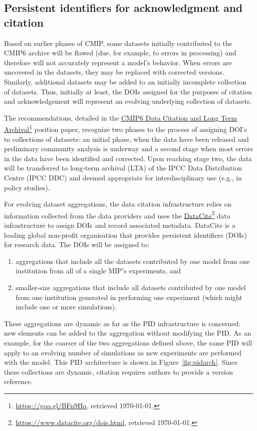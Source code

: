 \documentclass[gmd,manuscript]{copernicus}
\newcommand{\urlref}[2] {\href{#1}{#2}\footnote{\url{#1}, retrieved \today.}}
\begin{document}
\subsection{Persistent identifiers for acknowledgment and citation}
\label{sec:doi}


Based on earlier phases of CMIP, some datasets initially contributed
to the CMIP6 archive will be flawed (due, for example, to errors in
processing) and therefore will not accurately represent a model's
behavior. When errors are uncovered in the datasets, they may be
replaced with corrected versions. Similarly, additional datasets may
be added to an initially incomplete collection of datasets. Thus,
initially at least, the DOIs assigned for the purposes of citation and
acknowledgement will represent an evolving underlying collection of
datasets.

The recommendations, detailed in the
\urlref{https://goo.gl/BFn9Hq}{CMIP6 Data Citation and Long Term
  Archival} position paper, recognize two phases to the process of
assigning DOI's to collections of datasets: an initial phase, when the
data have been released and preliminary community analysis is 
underway and a second stage when most errors in the data have been
identified and corrected. Upon reaching stage two, the data will be
transferred to long-term archival (LTA) of the IPCC Data Distribution
Centre (IPCC DDC) and deemed appropriate for interdisciplinary use
(e.g., in policy studies). 

For evolving dataset aggregations, the data citation infrastructure
relies on information collected from the data providers and uses the
\urlref{https://www.datacite.org/dois.html}{DataCite} data
infrastructure to assign DOIs and record associated metadata.
DataCite is a leading global non-profit organisation that provides
persistent identifiers (DOIs) for research data. The DOIs will be
assigned to:

\begin{enumerate}
\item aggregations that include all the datasets contributed by one
  model from one institution from all of a single MIP's experiments,
  and
\item smaller-size aggregations that include all datasets contributed by one model
  from one institution generated in performing one experiment (which
  might include one or more simulations).
\end{enumerate}

These aggregations are dynamic as far as the PID infrastructure is
concerned: new elements can be added to the aggregation without
modifying the PID. As an example, for the coarser of the two
aggregations defined above, the same PID will apply to an evolving
number of simulations as new experiments are performed with the model.
This PID architecture is shown in Figure~\ref{fig:pidarch}. Since these
collections are dynamic, citation requires authors to provide a
version reference.
\end{document}
